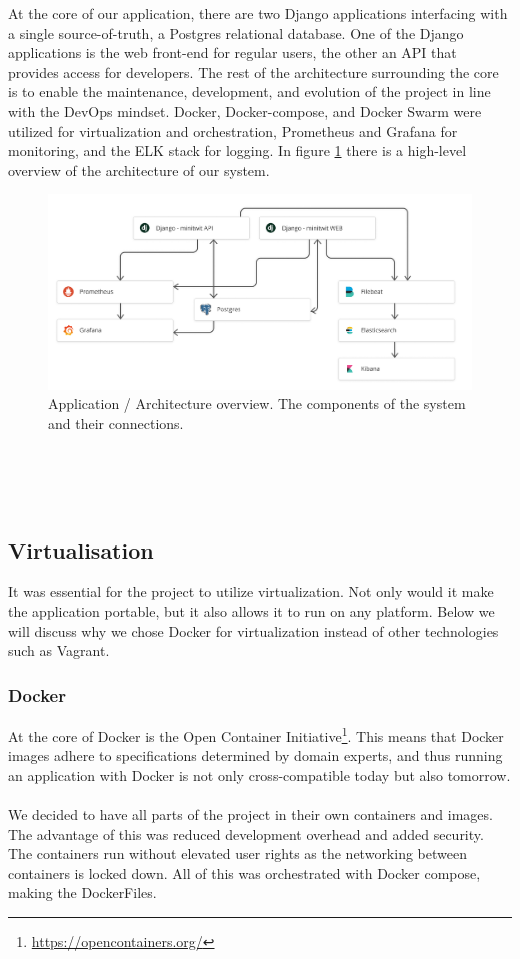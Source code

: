 \documentclass[11pt]{article}
\begin{document}
At the core of our application, there are two Django applications interfacing with a single source-of-truth, a Postgres relational database. One of the Django applications is the web front-end for regular users, the other an API that provides access for developers. The rest of the architecture surrounding the core is to enable the maintenance, development, and evolution of the project in line with the DevOps mindset. Docker, Docker-compose, and Docker Swarm were utilized for virtualization and orchestration, Prometheus and Grafana for monitoring, and the ELK stack for logging. In figure \ref{fig:structure} there is a high-level overview of the architecture of our system.
\begin{figure}[h!]
    \centering
    \includegraphics[width=16cm]{figures/structure.png}
    \caption{Application / Architecture overview. The components of the system and their connections. }
    \label{fig:structure}
\end{figure}
\ \\ \\ \\
\subsection{Virtualisation}
It was essential for the project to utilize virtualization. Not only would it make the application portable, but it also allows it to run on any platform. Below we will discuss why we chose Docker for virtualization instead of other technologies such as Vagrant. 

\subsubsection{Docker}
At the core of Docker is the Open Container Initiative\footnote{\url{https://opencontainers.org/}}. This means that Docker images adhere to specifications determined by domain experts, and thus running an application with Docker is not only cross-compatible today but also tomorrow.
\\\\
We decided to have all parts of the project in their own containers and images. The advantage of this was reduced development overhead and added security. The containers run without elevated user rights as the networking between containers is locked down. All of this was orchestrated with Docker compose, making the DockerFiles.   
\ \\
\end{document}
